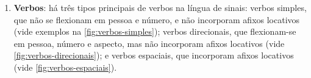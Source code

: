 \begin{enumerate}


    \item \textbf{Verbos}: há três tipos principais de verbos na língua de sinais: verbos simples, que não se flexionam em pessoa e número, e não incorporam afixos locativos (vide exemplos na \autoref{fig:verbos-simples});
    verbos direcionais, que flexionam-se em pessoa, número e aspecto, mas não incorporam afixos locativos (vide \autoref{fig:verbos-direcionais}); e
    verbos espaciais, que incorporam afixos locativos (vide \autoref{fig:verbos-espaciais}).


\end{enumerate}
